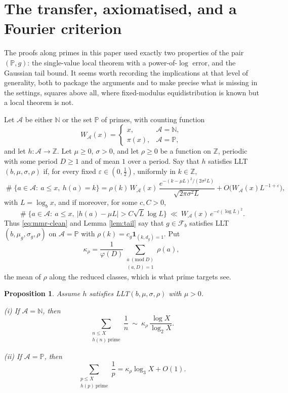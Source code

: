 \documentclass[11pt,reqno]{amsart}
\theoremstyle{plain}
\newtheorem{proposition}[theorem]{Proposition}
\theoremstyle{definition}
\newcommand{\N}{\mathbb{N}}
\newcommand{\Z}{\mathbb{Z}}
\DeclareMathOperator{\Card}{\#}
\begin{document}
\section{The transfer, axiomatised, and a Fourier criterion}\label{sec:transfer}

The proofs along primes in this paper used exactly two properties of the pair $(\mathbb P,g)$: the single-value local theorem with a power-of-$\log$ error, and the Gaussian tail bound. It seems worth recording the implications at that level of generality, both to package the arguments and to make precise what is missing in the settings, squares above all, where fixed-modulus equidistribution is known but a local theorem is not.

Let $\mathcal A$ be either $\N$ or the set $\mathbb P$ of primes, with counting function
\[
W_{\mathcal A}(x)=\begin{cases}x,&\mathcal A=\N,\\ \pi(x),&\mathcal A=\mathbb P,\end{cases}
\]
and let $h\colon\mathcal A\to\Z$. Let $\mu\ge0$, $\sigma>0$, and let $\rho\ge0$ be a function on $\Z$, periodic with some period $D\ge1$ and of mean $1$ over a period. Say that $h$ satisfies LLT$(b,\mu,\sigma,\rho)$ if, for every fixed $\varepsilon\in(0,\tfrac12)$, uniformly in $k\in\Z$,
\begin{equation}\label{eq:llt}
\Card\{a\in\mathcal A:\ a\le x,\ h(a)=k\}
=\rho(k)\,W_{\mathcal A}(x)\,\frac{e^{-(k-\mu L)^{2}/(2\sigma^{2}L)}}{\sqrt{2\pi\sigma^{2}L}}
+O\big(W_{\mathcal A}(x)L^{-1+\varepsilon}\big),
\end{equation}
with $L=\log_bx$, and if moreover, for some $c,C>0$,
\begin{equation}\label{eq:llttail}
\Card\{a\in\mathcal A:\ a\le x,\ |h(a)-\mu L|>C\sqrt L\log L\}\ \ll\ W_{\mathcal A}(x)\,e^{-c(\log L)^{2}}.
\end{equation}
Thus \eqref{eq:mmr-clean} and Lemma \ref{lem:tail} say that $g\in\mathcal F_b$ satisfies LLT$(b,\mu_g,\sigma_g,\rho)$ on $\mathcal A=\mathbb P$ with $\rho(k)=c_g\mathbf 1_{(k,d_g)=1}$. Put
\[
\kappa_\rho=\frac1{\varphi(D)}\sum_{\substack{a\ (\mathrm{mod}\ D)\\ (a,D)=1}}\rho(a),
\]
the mean of $\rho$ along the reduced classes, which is what prime targets see.

\begin{proposition}\label{prop:harman}
Assume $h$ satisfies LLT$(b,\mu,\sigma,\rho)$ with $\mu>0$.

(i) If $\mathcal A=\N$, then
\[
\sum_{\substack{n\le X\\ h(n)\ \text{prime}}}\frac1n\ \sim\ \kappa_\rho\,\frac{\log X}{\log_2X}.
\]

(ii) If $\mathcal A=\mathbb P$, then
\[
\sum_{\substack{p\le X\\ h(p)\ \text{prime}}}\frac1p=\kappa_\rho\log_3X+O(1).
\]
\end{proposition}
\end{document}
